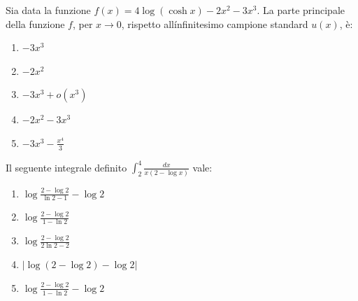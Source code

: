 \begin{quiz}
Sia data la funzione $f(x)=4\log(\cosh x)-2x^2-3x^3$. La parte principale della funzione $f$, per $x\to0$, rispetto all\'infinitesimo campione standard $u(x)$, \`e:
\begin{enumerate}
\item $-3x^3$
\item $-2x^2$
\item $-3x^3+o(x^3)$
\item $-2x^2-3x^3$
\item $-3x^3-\frac{x^4}3$
\end{enumerate}
\end{quiz}

\begin{quiz}
Il seguente integrale definito $\displaystyle\int_2^4\frac{dx}{x(2-\log x)}$ vale:
\begin{enumerate}
\item $\log\frac{2-\log2}{\ln2-1}-\log2$
\item $\log\frac{2-\log2}{1-\ln2}$
\item $\log\frac{2-\log2}{2\ln2-2}$
\item $|\log(2-\log2)-\log2|$
\item $\log\frac{2-\log2}{1-\ln2}-\log2$
\end{enumerate}
\end{quiz}

